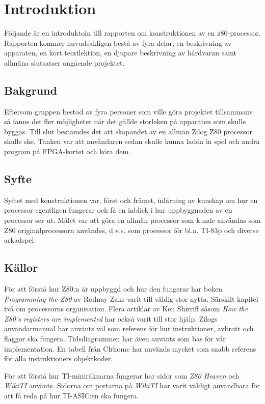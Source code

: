 \documentclass[main.tex]{subfiles}
\begin{document}
\section{Introduktion}
Följande är en introduktoin till rapporten om konstruktionen av en
z80-processor. Rapporten kommer huvudsakligen bestå av fyra delar; en
beskrivning av apparaten, en kort teorilektion, en djupare beskrivning av
hårdvaran samt allmäna slutsatser angående projektet.
\subsection{Bakgrund}
Eftersom gruppen bestod av fyra personer som ville göra projektet tillsammans
så fanns det fler möjligheter när det gällde storleken på apparaten som skulle
byggas. Till slut bestämdes det att skapandet av en allmän Zilog Z80 processor
skulle ske. Tanken var att användaren sedan skulle kunna ladda in spel och
andra program på FPGA-kortet och köra dem.
\subsection{Syfte}
Syftet med konstruktionen var, först och främst, inlärning av kunskap om hur en
processor egentligen fungerar och få en inblick i hur uppbyggnaden av en
processor ser ut. Målet var att göra en allmän processor som kunde användas som
Z80 originalprocessorn användes, d.v.s. som processor för bl.a. TI-83p och
diverse arkadspel.
\subsection{Källor}
För att förstå hur Z80:n är uppbyggd och hur den fungerar har boken {\it
Programming the Z80} \cite{zaks-z80prog} av Rodnay Zaks varit till väldig stor
nytta. Särskilt kapitel två om processorns organisation. Flera artiklar av Ken
Shirriff såsom {\it How the Z80's registers are implemented}
\cite{shirriff-reg} har också varit till stor hjälp. Zilogs användarmanual
\cite{z80um} har använts väl som referens för hur instruktioner, avbrott och
flaggor ska fungera. Tidsdiagrammen har även använts som bas för vår
implementation. En tabell från Clrhome \cite{clrhome} har används mycket som
snabb referens för alla instruktioners objektkoder.

För att förstå hur TI-miniräknarna fungerar har sidor som {\it Z80 Heaven}
\cite{z80heaven} och {\it WikiTI} \cite{brandonw} använts. Sidorna om portarna
på {\it WikiTI} har varit väldigt användbara för att få reda på hur TI-ASIC:en
ska fungera.

\clearpage
\end{document}
